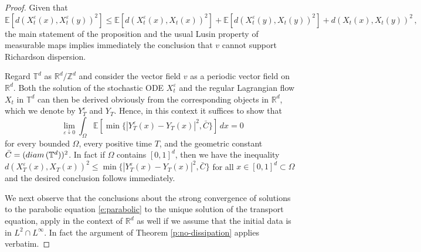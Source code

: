 \documentclass[10pt,a4paper]{amsart}
\begin{document}
\begin{proof} Given that 
\[
{\mathbb E} [ d (X^\varepsilon_t (x), X_t^\varepsilon (y))^2]
\leq {\mathbb E} [ d (X^\varepsilon_t (x), X_t (x))^2] + {\mathbb E} [ d (X^\varepsilon_t (y), X_t (y))^2]
+ d (X_t (x), X_t (y))^2\, ,
\]
the main statement of the proposition and the usual Lusin property of measurable maps implies immediately the conclusion that $v$ cannot support Richardson dispersion.

Regard $\mathbb T^d$ as $\mathbb R^d/\mathbb Z^d$ and consider the vector field $v$ as a periodic vector field on $\mathbb R^d$. Both the solution of the stochastic ODE $X^\varepsilon_t$ and the regular Lagrangian flow $X_t$ in $\mathbb T^d$ can then be derived obviously from the corresponding objects in $\mathbb R^d$, which we denote by $Y_T^\varepsilon$ and $Y_T$. Hence, in this context it suffices to show that 
\begin{equation}\label{e:target}
\lim_{\varepsilon\downarrow 0} \int_{\Omega} {\mathbb E} [\min\{ |Y_T^\varepsilon (x) - Y_T (x)|^2, \bar C\}]
\, dx = 0
\end{equation}
for every bounded $\Omega$, every positive time $T$, and the geometric constant $\bar C = ({\rm diam}\, (\mathbb T^d))^2$. In fact if $\Omega$ contains $[0,1]^d$, then we have the inequality $d (X_T^\varepsilon (x), X_T (x))^2 \leq \min \{ |Y_T^\varepsilon (x) - Y_T (x)|^2, \bar C\}$ for all $x\in [0,1]^d \subset \Omega$ and the desired conclusion follows immediately.

\medskip

We next observe that the conclusions about the strong convergence of solutions to the parabolic equation \eqref{e:parabolic} to the unique solution of the transport equation, apply in the context of $\mathbb R^d$ as well if we assume that the initial data is in $L^2\cap L^\infty$. In fact the argument of Theorem \ref{p:no-dissipation} applies verbatim. 

\medskip


\end{proof}
\end{document}
